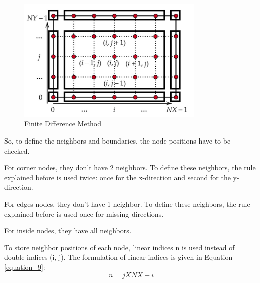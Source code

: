 \documentclass{article}
\begin{document}
\begin{figure}[hbt!]
    \centering
    \includegraphics[width=0.8\textwidth]{Figures/boundry_conditions.jpg}
    \caption{Finite Difference Method}
    \label{figure_2}
\end{figure}

So, to define the neighbors and boundaries, the node positions have to be checked. 

For corner nodes, they don't have 2 neighbors. To define these neighbors, the rule explained before is used twice: once for the x-direction and second for the y-direction.

For edges nodes, they don't have 1 neighbor. To define these neighbors, the rule explained before is used once for missing directions.

For inside nodes, they have all neighbors.

To store neighbor positions of each node, linear indices n is used instead of double indices
(i, j). The formulation of linear indices is given in Equation \ref{equation_9}:  
\begin{equation} %
    \ n = j X NX +i
    \label{equation_9}
\end{equation}
\end{document}
